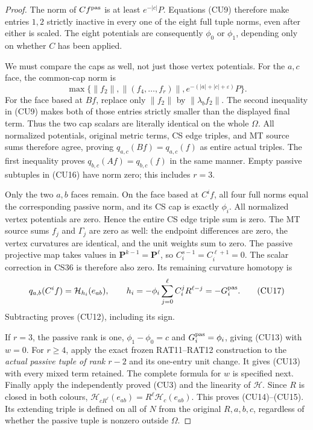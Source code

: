 \begin{proof}
The norm of $C f^{\rm pas}$ is at least $e^{-|c|}P$.  Equations
(CU9) therefore make entries $1,2$ strictly inactive in every one
of the eight full tuple norms, even after either is scaled.  The
eight potentials are consequently $\phi_0$ or $\phi_1$, depending
only on whether $C$ has been applied.

We must compare the caps as well, not just those vertex potentials.
For the $a,c$ face, the common-cap norm is
\[
 \max\{\|f_2\|,\|(f_4,\ldots,f_r)\|,
                           e^{-(|a|+|c|+\varepsilon)}P\}.
 \tag{CU16}
\]
For the face based at $Bf$, replace only $\|f_2\|$ by
$\|\lambda_b f_2\|$.  The second inequality in (CU9) makes both
of those entries strictly smaller than the displayed final term.
Thus the two cap scalars are literally identical on the whole
$\Omega$.  All normalized potentials, original metric terms,
CS edge triples, and MT source sums therefore agree, proving
$q_{a,c}(Bf)=q_{a,c}(f)$ as entire actual triples.  The first
inequality proves $q_{b,c}(Af)=q_{b,c}(f)$ in the same manner.
Empty passive subtuples in (CU16) have norm zero; this includes $r=3$.

Only the two $a,b$ faces remain.  On the face based at $C^i f$,
all four full norms equal the corresponding passive norm, and its
CS cap is exactly $\phi_i$.  All normalized vertex potentials are
zero.  Hence the entire CS edge triple sum is zero.  The MT source
sums $f_j$ and $\Gamma_j$ are zero as well: the endpoint differences
are zero, the vertex curvatures are identical, and the unit weights
sum to zero.  The passive projective map takes values in
$\mathbf P^{k-1}=\mathbf P^\ell$, so $C_i^{s-1}=C_i^{\ell+1}=0$.
The scalar correction in CS36 is therefore also zero.  Its remaining
curvature homotopy is
\[
 q_{a,b}(C^i f)=\mathcal H_{h_i}(e_{ab}),\qquad
 h_i=-\phi_i\sum_{j=0}^{\ell}C_i^jR^{\ell-j}=-G_i^{\rm pas}.
 \tag{CU17}
\]
Subtracting proves (CU12), including its sign.

If $r=3$, the passive rank is one, $\phi_1-\phi_0=c$ and
$G_i^{\rm pas}=\phi_i$, giving (CU13) with $w=0$.
For $r\ge4$, apply the exact frozen RAT11--RAT12 construction to
the \emph{actual passive tuple of rank $r-2$} and its one-entry
unit change.  It gives (CU13) with every mixed term retained.
The complete formula for $w$ is specified next.  Finally apply
the independently proved (CU3) and the linearity of $\mathcal H$.
Since $R$ is closed in both colours,
$\mathcal H_{cR^\ell}(e_{ab})=R^\ell\mathcal H_c(e_{ab})$.
This proves (CU14)--(CU15).  Its extending triple is defined on
all of $N$ from the original $R,a,b,c$, regardless of whether the
passive tuple is nonzero outside $\Omega$.
\end{proof}

